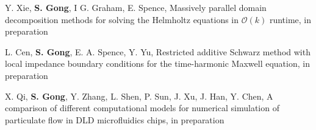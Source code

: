 \documentclass[letterpaper]{article}
\begin{document}
\begin{enumerate}[label={[\arabic*]},leftmargin=*]
\item Y. Xie, {\bf S. Gong}, I G. Graham, E. Spence, Massively parallel domain decomposition methods for solving the Helmholtz equations in $\mathcal{O}(k)$ runtime,  in preparation 

\item L. Cen, {\bf S. Gong}, E. A. Spence, Y. Yu, Restricted additive Schwarz method with local impedance boundary conditions for the time-harmonic Maxwell equation,  in preparation  


\item X. Qi, {\bf S. Gong}, Y. Zhang, L. Shen, P. Sun,  J. Xu, J. Han, Y. Chen, A comparison of different computational models for
numerical simulation of particulate flow in DLD microfluidics chips,  in preparation 






\end{enumerate}
\end{document}
